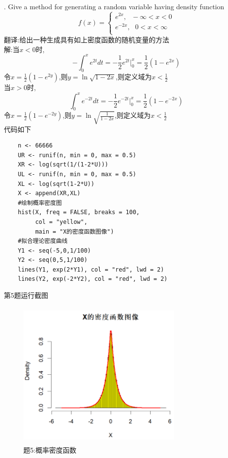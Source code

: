 \documentclass{book}
\begin{document}
\hspace*{\fill} \\

. Give a method for generating a random variable having density function
\begin{equation}
  f(x) =\left\{
  \begin{aligned}
    e^{2x} , \ \ \ -\infty < x < 0 \\
    e^{-2x}, \ \ \ 0 < x < \infty  \\
  \end{aligned}
  \right.
\end{equation}
翻译:给出一种生成具有如上密度函数的随机变量的方法 \\
解:当$x<0$时,
$$
  -\int_{0}^{x}e^{2t}dt = -\frac{1}{2}e^{2t}\bigg|_{0}^{x}
  = \frac{1}{2}(1-e^{2x})
$$
令$x = \frac{1}{2}(1-e^{2y})$,则$y=\ln\sqrt{1-2x}$,则定义域为$x<\frac{1}{2}$ \\
当$x>0$时,
$$
  \int_{0}^{x}e^{-2t}dt = -\frac{1}{2}e^{-2t}\bigg|_{0}^{x}
  = \frac{1}{2}(1-e^{-2x})
$$
令$x = \frac{1}{2}(1-e^{-2y})$,则$y=\ln\sqrt{\frac{1}{1-2x}}$,则定义域为$x<\frac{1}{2}$ \\
代码如下
\lstset{language = R}
\begin{lstlisting}
    n <- 66666
    UR <- runif(n, min = 0, max = 0.5)
    XR <- log(sqrt(1/(1-2*U)))
    UL <- runif(n, min = 0, max = 0.5)
    XL <- log(sqrt(1-2*U))
    X <- append(XR,XL)
    #绘制概率密度图
    hist(X, freq = FALSE, breaks = 100, 
         col = "yellow",
         main = "X的密度函数图像")
    #拟合理论密度曲线
    Y1 <- seq(-5,0,1/100)
    Y2 <- seq(0,5,1/100)
    lines(Y1, exp(2*Y1), col = "red", lwd = 2)
    lines(Y2, exp(-2*Y2), col = "red", lwd = 2)
\end{lstlisting}
第5题运行截图
\begin{figure}[H]
  \centering
  \includegraphics*[height = 7.4cm, width = 8.2cm]{gramFile/第五题/概率密度函数图像.PNG}
  \caption{题5:概率密度函数}
\end{figure}
\end{document}
